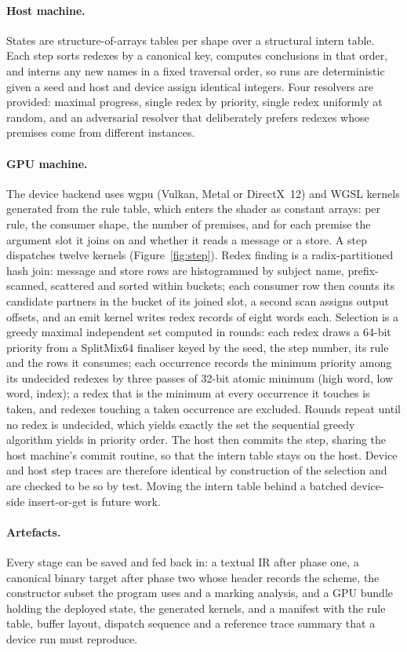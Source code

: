 \documentclass[acmsmall,screen,review,anonymous]{acmart}
\begin{document}
\paragraph{Host machine.} States are structure-of-arrays tables per shape over
a structural intern table. Each step sorts redexes by a canonical key,
computes conclusions in that order, and interns any new names in a fixed
traversal order, so runs are deterministic given a seed and host and device
assign identical integers. Four resolvers are provided: maximal progress,
single redex by priority, single redex uniformly at random, and an
adversarial resolver that deliberately prefers redexes whose premises come
from different instances.

\paragraph{GPU machine.} The device backend uses wgpu (Vulkan, Metal or
DirectX~12) and WGSL kernels generated from the rule table, which enters the
shader as constant arrays: per rule, the consumer shape, the number of
premises, and for each premise the argument slot it joins on and whether it
reads a message or a store. A step dispatches twelve kernels
(Figure~\ref{fig:step}). Redex finding is a radix-partitioned hash join:
message and store rows are histogrammed by subject name, prefix-scanned,
scattered and sorted within buckets; each consumer row then counts its
candidate partners in the bucket of its joined slot, a second scan assigns
output offsets, and an emit kernel writes redex records of eight words each.
Selection is a greedy maximal independent set computed in rounds: each redex
draws a 64-bit priority from a SplitMix64 finaliser keyed by the seed, the
step number, its rule and the rows it consumes; each occurrence records the minimum priority among its
undecided redexes by three passes of 32-bit atomic minimum (high word, low
word, index); a redex that is the minimum at every occurrence it touches is
taken, and redexes touching a taken occurrence are excluded. Rounds repeat
until no redex is undecided, which yields exactly the set the sequential
greedy algorithm yields in priority order. The host then commits the step,
sharing the host machine's commit routine, so that the intern table stays on
the host. Device and host step traces are therefore identical by
construction of the selection and are checked to be so by test. Moving the
intern table behind a batched device-side insert-or-get is future work.

\paragraph{Artefacts.} Every stage can be saved and fed back in: a textual IR
after phase one, a canonical binary target after phase two whose header
records the scheme, the constructor subset the program uses and a marking
analysis, and a GPU bundle holding the deployed state, the generated kernels,
and a manifest with the rule table, buffer layout, dispatch sequence and a
reference trace summary that a device run must reproduce.
\end{document}
